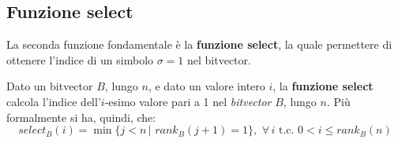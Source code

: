 \subsection{Funzione select}
La seconda funzione fondamentale è la \textbf{funzione select}, la quale
permettere di ottenere l'indice di un simbolo $\sigma=1$ nel bitvector.
\begin{definizione}
  Dato un bitvector $B$, lungo $n$, e dato un valore intero $i$, la
  \textbf{funzione select} calcola l'indice dell'$i$-esimo valore
  pari a 1 nel \textit{bitvector} $B$, lungo $n$. Più formalmente si ha, quindi,
  che:
  \begin{equation}
    \label{eq:selectbv}
    select_B(i)=\min\{j < n\,|\,\,rank_B(j+1)=1\},\,\,\forall\, i \mbox{ t.c. }
    0<i\leq rank_B(n)
  \end{equation}
\end{definizione}

